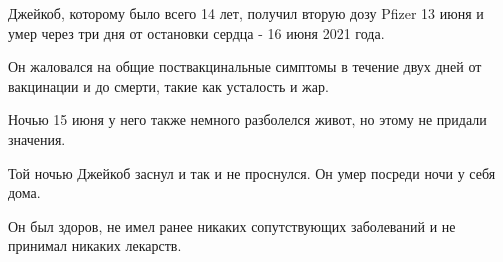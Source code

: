 Джейкоб, которому было всего 14 лет, получил вторую дозу Pfizer 13 июня и умер
через три дня от остановки сердца - 16 июня 2021 года.

Он жаловался на общие поствакцинальные симптомы в течение двух дней от
вакцинации и до смерти, такие как усталость и жар.

Ночью 15 июня у него также немного разболелся живот, но этому не придали
значения.

Той ночью Джейкоб заснул и так и не проснулся. Он умер посреди ночи у себя дома.

Он был здоров, не имел ранее никаких сопутствующих заболеваний и не принимал
никаких лекарств.
